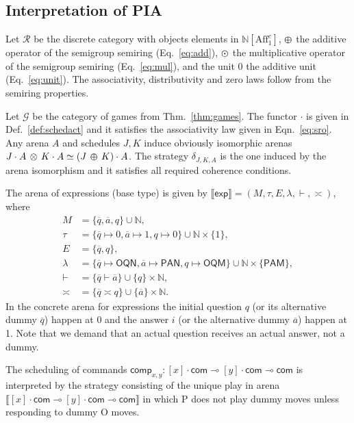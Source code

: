 \documentclass{article}
\newcommand{\aff}{\mathrm{Aff}_1^c}
\newcommand{\lexpt}{\mathsf{exp}}
\newcommand{\lcomt}{\mathsf{com}}
\newcommand{\lcompc}{\mathsf{comp}}
\newcommand{\sbr}[1]{\llbracket {#1}\rrbracket}
\newcommand{\mv}[1]{\mathsf{#1}}
\newcommand{\catplus}{\varoplus}
\newcommand{\cattimes}{\varodot}
\begin{document}
\subsection{Interpretation of PIA}
Let $\mathcal R$ be the discrete category with objects elements in $\mathbb N[\aff]$, $\catplus$ the additive operator of the semigroup semiring (Eq.~\ref{eq:add}), $\cattimes$ the multiplicative operator of the semigroup semiring (Eq.~\ref{eq:mul}), and the unit $0$ the additive unit (Eq.~\ref{eq:unit}). The associativity, distributivity and zero laws  follow from the semiring properties. 

Let $\mathcal G$ be the category of games from Thm.~\ref{thm:games}. The functor $\cdot$ is given in Def.~\ref{def:schedact} and it satisfies the associativity law given in Eqn.~\ref{eq:sro}. Any arena $A$ and schedules $J,K$ induce obviously isomorphic arenas
 $J\cdot A\,\otimes\, K\cdot A\simeq (J\,\catplus\, K)\cdot A$. The strategy $\delta_{J,K,A}$ is the one induced by the arena isomorphism and it satisfies all required coherence conditions. 

The arena of expressions (base type) is given by $\sbr{\lexpt}=(M,\tau,E,\lambda,\vdash,\asymp)$, where
\begin{align*}
M& =  \{\overline q, \overline a, q\}\cup \mathbb N, \\
\tau& =  \{\overline q\mapsto 0, \overline a\mapsto 1, q\mapsto 0\} \cup \mathbb N\times \{1\},\\
E &= \{\overline q, q\},\\
\lambda& =  \{\overline q\mapsto \mv{OQN}, \overline a\mapsto\mv{PAN}, q\mapsto\mv{OQM}\}\cup \mathbb N\times\{\mv{PAM}\},\\
{\vdash} &=  \{\overline q\vdash\overline a\}\cup \{q\}\times\mathbb N,\\
{\asymp} &= \{\overline q\asymp q\}\cup \{\overline a\}\times\mathbb N.
\end{align*}
In the concrete arena for expressions the initial question $q$ (or its alternative dummy $\overline q$) happen at 0 and the answer $i$ (or the alternative dummy $\overline a$) happen at 1. Note that we demand that an actual question receives an actual answer, not a dummy. 

The scheduling of commands $\lcompc_{x,y}:[x]\cdot\lcomt \multimap[y]\cdot\lcomt\multimap\lcomt$ is interpreted by the strategy consisting of the unique play in arena $\sbr{[x]\cdot\lcomt\multimap[y]\cdot\lcomt\multimap\lcomt}$ in which P does not play dummy moves unless responding to dummy O moves.
\end{document}
